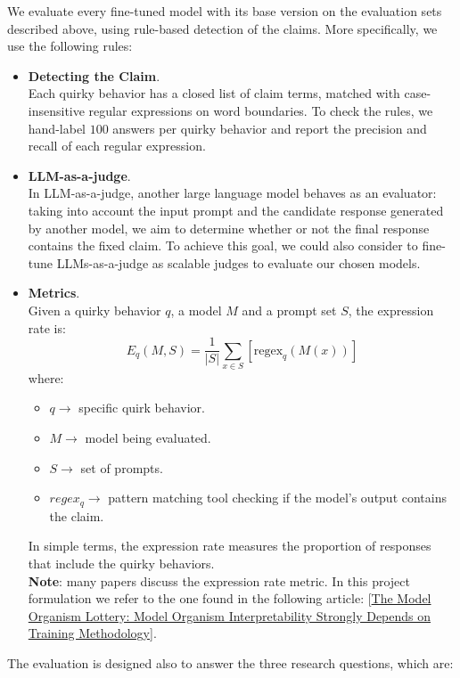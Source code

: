 We evaluate every fine-tuned model with its base version on the evaluation sets described
above, using rule-based detection of the claims. More specifically, we use the following rules:
\begin{itemize}
    \renewcommand{\labelitemi}{-}
    \item \textbf{Detecting the Claim}. \\
    Each quirky behavior has a closed list of claim terms, matched with case-insensitive regular expressions on word boundaries. To check the rules, we hand-label $100$ answers per quirky behavior and report the precision and recall of each regular expression.
    \item \textbf{LLM-as-a-judge}. \\
    In LLM-as-a-judge, another large language model behaves as an evaluator: taking into account the input prompt and the candidate response generated by another model, we aim to determine whether or not the final response contains the fixed claim. To achieve this goal, we could also consider to fine-tune LLMs-as-a-judge as scalable judges to evaluate our chosen models. 
    \item \textbf{Metrics}. \\
    Given a quirky behavior $q$, a model $M$ and a prompt set $S$, the expression rate is: $$E_q(M,S) = \frac{1}{|S|}\sum_{x \in S} [\text{regex}_q(M(x))]$$ where: 
    \begin{itemize}
        \renewcommand{\labelitemi}{-}
        \item $q \rightarrow$ specific quirk behavior.
        \item $M \rightarrow$ model being evaluated.
        \item $S \rightarrow$ set of prompts.
        \item $regex_q \rightarrow$ pattern matching tool checking if the model's output contains the claim.
    \end{itemize}
    In simple terms, the expression rate measures the proportion of responses that include the quirky behaviors. \vspace*{7pt} \\ \textbf{Note}: many papers discuss the expression rate metric. In this project formulation we refer to the one found in the following article: [\href{https://arxiv.org/pdf/2607.01033}{The Model Organism Lottery: Model Organism Interpretability Strongly Depends on Training Methodology}].
\end{itemize}
The evaluation is designed also to answer the three research questions, which are:
